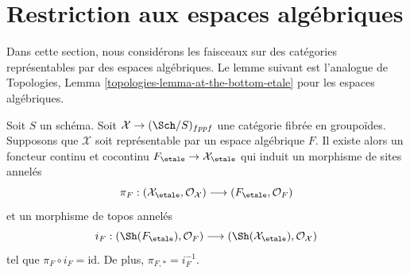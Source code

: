 \section{Restriction aux espaces algébriques}
\label{section-restriction-algebraic-spaces}

\noindent
Dans cette section, nous considérons les faisceaux sur des catégories représentables par des
espaces algébriques. Le lemme suivant est l'analogue de
Topologies, Lemma \ref{topologies-lemma-at-the-bottom-etale}
pour les espaces algébriques.

\begin{lemma}
\label{lemma-compare}
Soit $S$ un schéma. Soit $\mathcal{X} \to (\Sch/S)_{fppf}$ une catégorie
fibrée en groupoïdes. Supposons que $\mathcal{X}$ soit représentable par un espace
algébrique $F$. Il existe alors un foncteur continu et cocontinu
$
F_\etale \to \mathcal{X}_\etale
$
qui induit un morphisme de sites annelés
$$
\pi_F :
(\mathcal{X}_\etale, \mathcal{O}_\mathcal{X})
\longrightarrow
(F_\etale, \mathcal{O}_F)
$$
et un morphisme de topos annelés
$$
i_F :
(\Sh(F_\etale), \mathcal{O}_F)
\longrightarrow
(\Sh(\mathcal{X}_\etale), \mathcal{O}_\mathcal{X})
$$
tel que $\pi_F \circ i_F = \text{id}$. De plus, $\pi_{F, *} = i_F^{-1}$.
\end{lemma}

